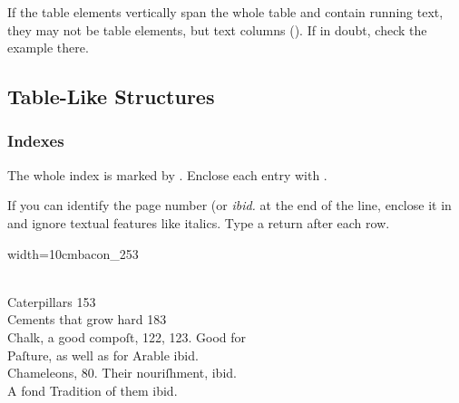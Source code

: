 \vspace{3mm}
\begin{note}
If the table elements vertically span the whole table and contain running text, they may not be table elements, but text columns (). If in doubt, check the example there.
\end{note}



\tocspace
\subsection{Table-Like Structures}
\label{section table-like structures}

\subsubsection{Indexes}
\label{section indexes}

\begin{mainrule}
  The whole index is marked by . Enclose each entry with .

  If you can identify the page number (or \emph{ibid.} at the end of the line, enclose it in  and ignore textual features like italics. Type a return after each row.
\end{mainrule}



\begin{sampleImageSmall}[ 1]{width=10cm}{bacon_253}

\begin{typeLatin}
 \\
Caterpillars  153 \\
Cements that grow hard  183 \\
Chalk, a good compoſt, 122, 123. Good for \\
Paſture, as well as for Arable  ibid. \\
Chameleons, 80. Their nouriſhment,  ibid. \\
A fond Tradition of them ibid. \\
\end{typeLatin}
\end{sampleImageSmall}

